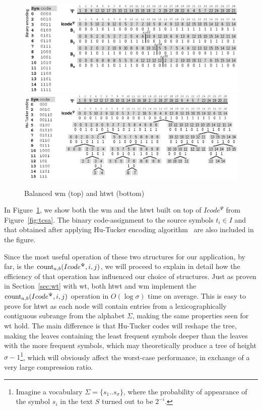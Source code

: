 	\begin{figure}[ht]
		\begin{center}
			{\includegraphics[width=1.0\textwidth]{figures/wma.eps}}
			{\includegraphics[width=1.0\textwidth]{figures/wta.eps}}
		\end{center}
		\caption{Balanced \acrshort{wm} (top) and \acrshort{htwt} (bottom)}
		\label{fig:wtwm}
	\end{figure}


	In Figure~\ref{fig:wtwm}, we show both the \gls{wm} and the \gls{htwt} built on top of $Icode^{\Psi}$ from Figure~\ref{fig:tcsa}.
	The binary code-assignment to the source symbols $t_i \in I$ and that obtained after applying Hu-Tucker encoding
	algorithm~\cite{hu1971optimal} are also included in the figure.
	
	Since the most useful operation of these two structures for our application, by far, is the $\operatorname{count}_{a,b}(Icode^{\Psi},i,j)$, we will proceed to explain in detail how the efficiency of that operation has influenced our choice of structures. Just as proven in Section~\ref{sec:wt} with \gls{wt}, both \gls{htwt} and \gls{wm} implement the $\operatorname{count}_{a,b}(Icode^{\Psi},i,j)$ operation in $O(\log\sigma)$ time on average. This is easy to prove for \gls{htwt} as each node will contain entries from a lexicographically contiguous subrange from the alphabet $\Sigma$, making the same properties seen for \gls{wt} hold. The main difference is that Hu-Tucker codes will reshape the tree, making the leaves containing the least frequent symbols deeper than the leaves with the more frequent symbols, which may theoretically produce a tree of height $\sigma-1$\footnote{Imagine a vocabulary $\Sigma=\{s_1..s_\sigma\}$, where the probability of appearance of the symbol $s_i$ in the text $S$ turned out to be $2^{-i}$.}, which will obviously affect the worst-case performance, in exchange of a very large compression ratio.

